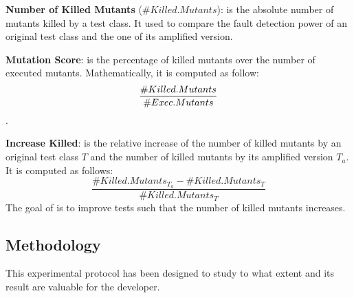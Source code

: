 \textbf{Number of Killed Mutants} ($\#Killed.Mutants$): is the absolute number of mutants killed by a test class. 
It used to compare the fault detection power of an original test class and the one of its amplified version.

\textbf{Mutation Score}: is the percentage of killed mutants over the number of executed mutants.
 Mathematically, it is computed as follow: $$\frac{\#Killed.Mutants}{\#Exec.Mutants} \time 100$$.

\textbf{Increase Killed}: is the relative increase of the number of killed mutants by an original test class $T$ and the number of killed mutants by its amplified version $T_a$.
It is computed as follows:
$$\frac{\#Killed.Mutants_{T_a} - \#Killed.Mutants_T}{\#Killed.Mutants_T}$$
The goal of \dspot is to improve tests such that the number of killed mutants increases.

\subsection{Methodology}
\label{subsec:test-improvement:experiment-protocol:methodology}

This experimental protocol has been designed to study to what extent \dspot and its result are valuable for the developer.

